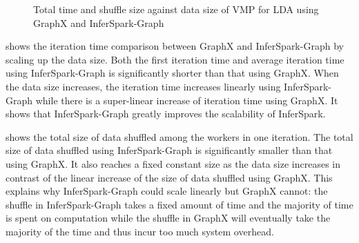 \begin{figure}[h]
\centering
	\caption{Total time and shuffle size against data size of VMP for LDA using GraphX and
	InferSpark-Graph}
	\label{fig:graph_cmp_shuffle_size_total_time_datasize}
\end{figure}

 shows the iteration time
comparison between GraphX and InferSpark-Graph by scaling up the data size.
Both the first iteration time and average iteration time 
using InferSpark-Graph is significantly shorter than that using
GraphX. When the data size increases, the iteration time increases linearly
using InferSpark-Graph while there is a super-linear increase of iteration
time using GraphX. It shows that InferSpark-Graph greatly improves the
scalability of InferSpark.

 shows the total size of data
shuffled among the workers in one iteration. The total size of data shuffled
using InferSpark-Graph is significantly smaller than that using GraphX. It
also reaches a fixed constant size as the data size increases in contrast of
the linear increase of the size of data shuffled using GraphX. This explains
why InferSpark-Graph could scale linearly but GraphX cannot: the shuffle in
InferSpark-Graph takes a fixed amount of time and the majority of time is
spent on computation while the shuffle in GraphX will eventually take the
majority of the time and thus incur too much system overhead.

